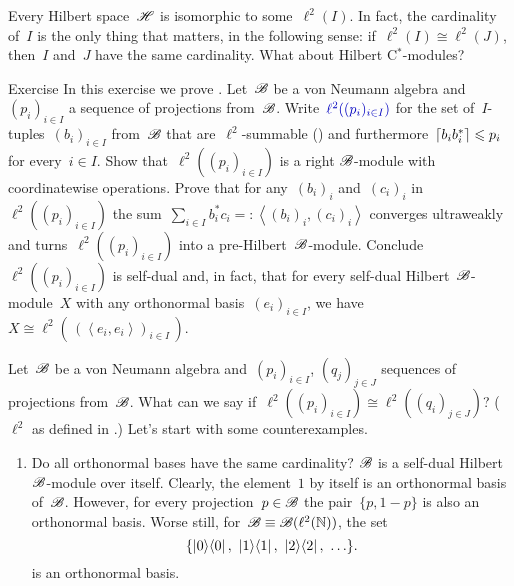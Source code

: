 \begin{parsec}%
\begin{point}%
Every Hilbert space~$\mathscr{H}$ is isomorphic to some~$\ell^2(I)$.
In fact, the cardinality of~$I$ is the only thing that matters,
    in the following sense:
    if~$\ell^2(I) \cong \ell^2(J)$, then~$I$ and~$J$
    have the same cardinality.
What about Hilbert C$^*$-modules?
\end{point}
\begin{point}[hilbmod-el2]{Exercise}%
In this exercise we prove \cite[Thm.~3.12]{paschke}.
Let~$\mathscr{B}$ be a von Neumann algebra
    and~$(p_i)_{i \in I}$
    a sequence of projections from~$\mathscr{B}$.
    Write~$\Define{\ell^2((p_i)_{i \in I})}$
    for the set of~$I$-tuples~$(b_i)_{i \in I}$
    from~$\mathscr{B}$ that are~$\ell^2$-summable ()
    and furthermore~$\left\lceil b_ib_i^*\right\rceil \leqslant p_i$ for every~$i \in I$.
Show that~$\ell^2((p_i)_{i \in I})$
    is a right $\mathscr{B}$-module
    with coordinatewise operations.
Prove that for any~$(b_i)_i$ and~$(c_i)_i$
    in~$\ell^2((p_i)_{i \in I})$
    the sum~$\sum_{i \in I} b_i^* c_i =: \left<(b_i)_i, (c_i)_i\right>$
    converges ultraweakly
    and turns~$\ell^2((p_i)_{i\in I})$ into a pre-Hilbert~$\mathscr{B}$-module.
    Conclude~$\ell^2((p_i)_{i \in I})$ is self-dual
and, in fact, that for every self-dual Hilbert~$\mathscr{B}$-module~$X$
    with any orthonormal basis~$(e_i)_{i \in I}$,
    we have~$X \cong \ell^2(\,(\left<e_i,e_i\right>)_{i \in I}\,)$.
\end{point}

\begin{point}%
    Let~$\mathscr{B}$ be a von Neumann algebra
        and~$(p_i)_{i \in I}$, $(q_j)_{j \in J}$
        sequences of projections from~$\mathscr{B}$.
    What can we say if~$\ell^2((p_i)_{i \in I}) 
    \cong \ell^2((q_i)_{j \in J})$?
    ($\ell^2$ as defined in .)
    Let's start with some counterexamples.
\begin{enumerate}
\item
Do all orthonormal bases have the same cardinality?
$\mathscr{B}$ is a self-dual Hilbert~$\mathscr{B}$-module over itself.
Clearly, the element~$1$ by itself is an orthonormal basis of~$\mathscr{B}$.
However, for every projection~$p \in \mathscr{B}$
        the pair~$\{ p,1-p \}$ is also an orthonormal basis.
    Worse still, for~$\mathscr{B} \equiv \mathscr{B}(\ell^2(\mathbb{N}))$,
        the set
\begin{equation*}
    \{\ketbra{0}{0}, \ \ketbra{1}{1},\  \ketbra{2}{2},\  \ldots \}.
\end{equation*}
is an orthonormal basis.


\end{enumerate}
\end{point}
\end{parsec}
